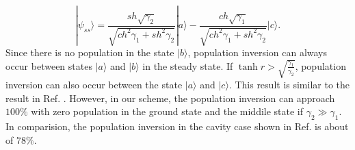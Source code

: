 \documentclass[aps,showpacs,twocolumn,twoside,groupedaddress]{revtex4}
\begin{document}
\begin{equation}	
|\psi_{ss}\rangle=\frac{sh\sqrt{\gamma_{2}}}{\sqrt{ch^{2}\gamma_{1}+sh^{2}\gamma_{2}}}|a\rangle-\frac{ch\sqrt{\gamma_{1}}}{\sqrt{ch^{2}\gamma_{1}+sh^{2}\gamma_{2}}}|c\rangle.
\end{equation}
Since there is no population in the state $|b\rangle$,  population inversion can always occur between states $|a\rangle$ and $|b\rangle$ in the steady state. If $\tanh r>\sqrt{\frac{\gamma_{1}}{\gamma_{2}}}$, population inversion can also occur between the state $|a\rangle$ and $|c\rangle$. This  result is similar to the result in Ref.  \cite{ficek1993two}. However, in our scheme, the population inversion can approach $100\%$ with zero population in the ground state and the middile state if $\gamma_2\gg\gamma_1$.  In comparision, the population inversion in the cavity case shown in Ref. \cite{ficek1993two} is about  of $78\%$.   

\end{document}
